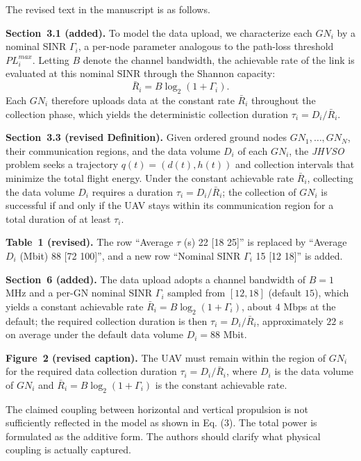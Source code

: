 \begin{revresponse}[]
	The revised text in the manuscript is as follows.
	\begin{changes}
		\textbf{Section~3.1 (added).} To model the data upload, we characterize each $GN_i$ by a nominal SINR $\Gamma_i$, a per-node parameter analogous to the path-loss threshold $PL_i^{max}$. Letting $B$ denote the channel bandwidth, the achievable rate of the link is evaluated at this nominal SINR through the Shannon capacity:
		\begin{equation*}
			\bar{R}_i = B\log_2(1+\Gamma_i).
		\end{equation*}
		Each $GN_i$ therefore uploads data at the constant rate $\bar{R}_i$ throughout the collection phase, which yields the deterministic collection duration $\tau_i = D_i/\bar{R}_i$.

		\textbf{Section~3.3 (revised Definition).} Given ordered ground nodes $GN_1,\ldots,GN_N$, their communication regions, and the data volume $D_i$ of each $GN_i$, the \textit{JHVSO} problem seeks a trajectory $q(t)=(d(t),h(t))$ and collection intervals that minimize the total flight energy. Under the constant achievable rate $\bar{R}_i$, collecting the data volume $D_i$ requires a duration $\tau_i=D_i/\bar{R}_i$; the collection of $GN_i$ is successful if and only if the UAV stays within its communication region for a total duration of at least $\tau_i$.

		\textbf{Table~1 (revised).} The row ``Average $\tau$ (s) 22 [18 25]'' is replaced by ``Average $D_i$ (Mbit) 88 [72 100]'', and a new row ``Nominal SINR $\Gamma_i$ 15 [12 18]'' is added.

		\textbf{Section~6 (added).} The data upload adopts a channel bandwidth of $B=1$ MHz and a per-GN nominal SINR $\Gamma_i$ sampled from $[12,18]$ (default $15$), which yields a constant achievable rate $\bar{R}_i=B\log_2(1+\Gamma_i)$, about $4$ Mbps at the default; the required collection duration is then $\tau_i=D_i/\bar{R}_i$, approximately $22$ s on average under the default data volume $D_i=88$ Mbit.

		\textbf{Figure~2 (revised caption).} The UAV must remain within the region of $GN_i$ for the required data collection duration $\tau_i=D_i/\bar{R}_i$, where $D_i$ is the data volume of $GN_i$ and $\bar{R}_i=B\log_2(1+\Gamma_i)$ is the constant achievable rate.
	\end{changes}
\end{revresponse}

\begin{revcomment}
	The claimed coupling between horizontal and vertical propulsion is not sufficiently reflected in the model as shown in Eq. (3). The total power is formulated as the additive form. The authors should clarify what physical coupling is actually captured.
\end{revcomment}


